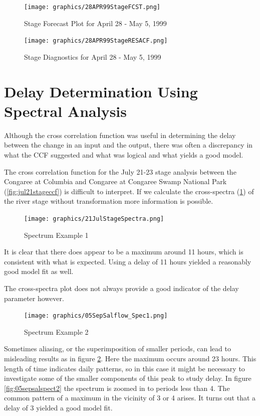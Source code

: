 \documentclass[12pt]{report}
\begin{document}
\begin{figure}[h]
\centering\texttt{[image: graphics/28APR99StageFCST.png]}
\centering\caption{Stage Forecast Plot for April 28 - May 5, 1999}
\end{figure}

\begin{figure}[h]
\centering\texttt{[image: graphics/28APR99StageRESACF.png]}
\centering\caption{Stage Diagnostics for April 28 - May 5, 1999}
\end{figure}

\clearpage
\section{Delay Determination Using Spectral Analysis}
Although the cross correlation function was useful in determining
the delay between the change in an input and the output, there was
often a discrepancy in what the CCF suggested and what was logical
and what yields a good model.

The cross correlation function for the July 21-23 stage analysis
between the Congaree at Columbia and Congaree at Congaree Swamp
National Park (\ref{fig:jul21stageccf}) is difficult to interpret.
If we calculate the cross-spectra (\ref{fig:21julspect}) of the
river stage without transformation more information is possible.

\begin{figure}[h]\centering
\texttt{[image: graphics/21JulStageSpectra.png]}
\caption{Spectrum Example 1}\label{fig:21julspect}
\end{figure}
It is clear that there does appear to be a maximum around 11
hours, which is consistent with what is expected.  Using a delay
of 11 hours yielded a reasonably good model fit as well.

The cross-spectra plot does not always provide a good indicator of
the delay parameter however.
\begin{figure}[h]\centering
\texttt{[image: graphics/05SepSalflow\_Spec1.png]}
\caption{Spectrum Example 2}\label{fig:05sepsalspect1}
\end{figure}

Sometimes aliasing, or the superimposition of smaller periods, can
lead to misleading results as in figure \ref{fig:05sepsalspect1}.
Here the maximum occurs around 23 hours.  This length of time
indicates daily patterns, so in this case it might be necessary to
investigate some of the smaller components of this peak to study
delay. In figure \ref{fig:05sepsalspect2} the spectrum is zoomed
in to periods less than 4.  The common pattern of a maximum in the
vicinity of 3 or 4 arises.  It turns out that a delay of 3 yielded
a good model fit.
\end{document}
